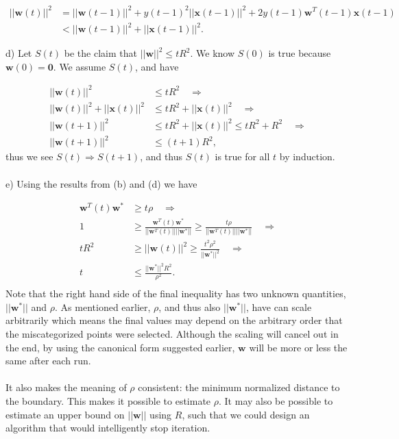 \documentclass[11pt,letterpaper]{article}
\newcommand{\vv}[1]{\mathbf{#1}} %
\begin{document}
\begin{align*}
    ||\vv{w}(t)||^2 &= ||\vv{w}(t - 1)||^2 + y(t-1)^2||\vv{x}(t - 1)||^2 + 2 y(t-1)\vv{w}^T(t - 1)\vv{x}(t-1) \\
    &< ||\vv{w}(t - 1)||^2 + ||\vv{x}(t-1)||^2.
\end{align*}

d) Let $S(t)$ be the claim that $||\vv{w}||^2 \le tR^2$.  We know $S(0)$ is true because $\vv{w}(0) = \vv{0}$.  We assume $S(t)$, and have

\begin{align*}
    ||\vv{w}(t)||^2 &\le tR^2 \quad \Longrightarrow \\
    ||\vv{w}(t)||^2 + ||\vv{x}(t)||^2 &\le tR^2 + ||\vv{x}(t)||^2 \quad \Longrightarrow \\
    ||\vv{w}(t + 1)||^2 &\le tR^2 + ||\vv{x}(t)||^2 \le tR^2 + R^2 \quad \Longrightarrow \\
    ||\vv{w}(t + 1)||^2 &\le (t + 1)R^2,
\end{align*}
thus we see $S(t) \Rightarrow S(t + 1)$, and thus $S(t)$ is true for all $t$ by induction.
\\\\
e) Using the results from (b) and (d) we have

\begin{align*}
    \vv{w}^T(t)\vv{w}^* &\ge t\rho \quad \Longrightarrow \\
    1 &\ge \frac{\vv{w}^T(t)\vv{w}^*}{||\vv{w}^T(t)|| ||\vv{w}^*||} \ge \frac{t\rho}{||\vv{w}^T(t)|| ||\vv{w}^*||} \quad \Longrightarrow \\
    tR^2 &\ge ||\vv{w}(t)||^2 \ge \frac{t^2 \rho^2}{||\vv{w}^*||^2} \quad \Longrightarrow \\
    t &\le \frac{||\vv{w}^*||^2R^2}{\rho^2}. \\
\end{align*}
Note that the right hand side of the final inequality has two unknown quantities, $||\vv{w}^*||$ and $\rho$.  As mentioned earlier, $\rho$, and thus also $||\vv{w}^*||$, have can scale arbitrarily which means the final values may depend on the arbitrary order that the miscategorized points were selected.  Although the scaling will cancel out in the end, by using the canonical form suggested earlier, $\vv{w}$ will be more or less the same after each run.
\\\\
It also makes the meaning of $\rho$ consistent: the minimum normalized distance to the boundary.  This makes it possible to estimate $\rho$.  It may also be possible to estimate an upper bound on $||\vv{w}||$ using $R$, such that we could design an algorithm that would intelligently stop iteration.
\end{document}

